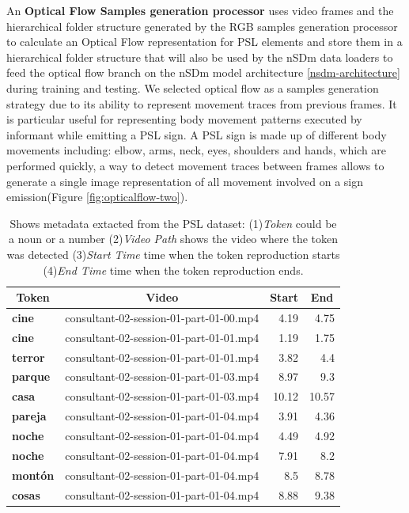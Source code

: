\documentclass[twocolumn,conference]{article}
\begin{document}
An \textbf{Optical Flow Samples generation processor} uses video frames and the hierarchical folder structure generated by the RGB samples generation processor to calculate an Optical Flow representation for PSL elements and store them in a hierarchical folder structure that will also be used by the nSDm data loaders to feed the optical flow branch on the nSDm model architecture \ref{nsdm-architecture} during training and testing. We selected optical flow as a samples generation strategy due to its ability to represent movement traces from previous frames. It is particular useful for representing body movement patterns executed by informant while emitting a PSL sign. A PSL sign is made up of different body movements including: elbow, arms, neck, eyes, shoulders and hands, which are performed quickly, a way to detect movement traces between frames allows to generate a single image representation of all movement involved on a sign emission(Figure \ref{fig:opticalflow-two}). 

\begin{table}[!htb]
\captionsetup{font=footnotesize}
\centering
\begin{tabular}{ l p{10em} r r }
\toprule
\multicolumn{1}{c}{\textbf{Token}} & 
	\multicolumn{1}{c}{\textbf{Video}} &
	\multicolumn{1}{c}{\textbf{Start}} &
	\multicolumn{1}{c}{\textbf{End}}\\
\midrule
\textbf{cine}&	consultant-02-session-01-part-01-00.mp4&	4.19&	4.75\\
\textbf{cine}&	consultant-02-session-01-part-01-01.mp4&	1.19&	1.75\\
\textbf{terror}&	consultant-02-session-01-part-01-01.mp4&	3.82&	4.4\\
\textbf{parque}&	consultant-02-session-01-part-01-03.mp4&	8.97&	9.3\\
\textbf{casa}&	consultant-02-session-01-part-01-03.mp4&	10.12&	10.57\\
\textbf{pareja}&	consultant-02-session-01-part-01-04.mp4&	3.91&	4.36\\
\textbf{noche}&	consultant-02-session-01-part-01-04.mp4&	4.49&	4.92\\
\textbf{noche}&	consultant-02-session-01-part-01-04.mp4&	7.91&	8.2\\
\textbf{mont\'on}&	consultant-02-session-01-part-01-04.mp4&	8.5&	8.78\\
\textbf{cosas}&	consultant-02-session-01-part-01-04.mp4&	8.88&	9.38\\
\bottomrule
\end{tabular}
\caption{Shows metadata extacted from the PSL dataset: (1)\textit{Token} could be a noun or a number (2)\textit{Video Path} shows the video where the token was detected (3)\textit{Start Time} time when the token reproduction starts (4)\textit{End Time} time when the token reproduction ends.}
\label{tab:token-video-mapping}
\end{table}
\end{document}
